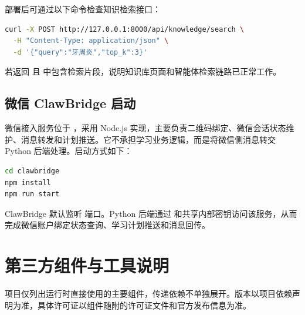 部署后可通过以下命令检查知识检索接口：

\begin{lstlisting}[language=bash]
curl -X POST http://127.0.0.1:8000/api/knowledge/search \
  -H "Content-Type: application/json" \
  -d '{"query":"牙周炎","top_k":3}'
\end{lstlisting}

若返回  且  中包含检索片段，说明知识库页面和智能体检索链路已正常工作。

\subsection{微信 ClawBridge 启动}

微信接入服务位于 ，采用 Node.js 实现，主要负责二维码绑定、微信会话状态维护、消息转发和计划推送。它不承担学习业务逻辑，而是将微信侧消息转交 Python 后端处理。启动方式如下：

\begin{lstlisting}[language=bash,caption={ClawBridge 启动命令},label={lst:clawbridge-start}]
cd clawbridge
npm install
npm run start
\end{lstlisting}

ClawBridge 默认监听  端口。Python 后端通过  和共享内部密钥访问该服务，从而完成微信账户绑定状态查询、学习计划推送和消息回传。

\section{第三方组件与工具说明}

项目仅列出运行时直接使用的主要组件，传递依赖不单独展开。版本以项目依赖声明为准，具体许可证以组件随附的许可证文件和官方发布信息为准。

